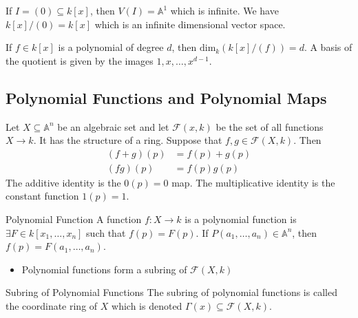 \documentclass{report}
\begin{document}
\begin{examples}
    \begin{example}
        If $I = (0) \subseteq k[x]$, then $V(I) = \mathbb{A}^{1}$ which is infinite. We have $k[x]/(0) = k[x]$ which is an infinite dimensional vector space.
    \end{example}
    \begin{example}
        If $f \in k[x]$ is a polynomial of degree $d$, then $\text{dim}_{k}(k[x]/(f)) = d$. A basis of the quotient is given by the images $1, x, \ldots , x^{d - 1}$.
    \end{example}
\end{examples}

\begin{topic}
    \section{Polynomial Functions and Polynomial Maps}
\end{topic}

Let $X \subseteq \mathbb{A}^{n}$ be an algebraic set and let $\mathcal{F}(x, k)$ be the set of all functions $X \rightarrow k$. It has the structure of a ring. Suppose that $f, g \in \mathcal{F}(X, k)$. Then 
    \begin{align*}
        (f + g)(p) &= f(p)+ g(p) \\
        (fg)(p)    &= f(p)g(p)     
    \end{align*}
The additive identity is the $0(p) = 0$ map. The multiplicative identity is the constant function $1(p) = 1$.

\begin{definition}{Polynomial Function}
    A function $f : X \rightarrow k$ is a polynomial function is $\exists F \in k[x_{1}, \ldots , x_{n}]$ such that $f(p) = F(p)$. If $P(a_{1}, \ldots , a_{n}) \in \mathbb{A}^{n}$, then $f(p) = F(a_{1}, \ldots , a_{n})$. 
\end{definition}
    \begin{itemize}
        \item Polynomial functions form a subring of $\mathcal{F}(X, k)$
    \end{itemize}

\begin{definition}{Subring of Polynomial Functions}
    The subring of polynomial functions is called the coordinate ring of $X$ which is denoted $\Gamma(x) \subseteq \mathcal{F}(X, k)$.
\end{definition}
\end{document}
